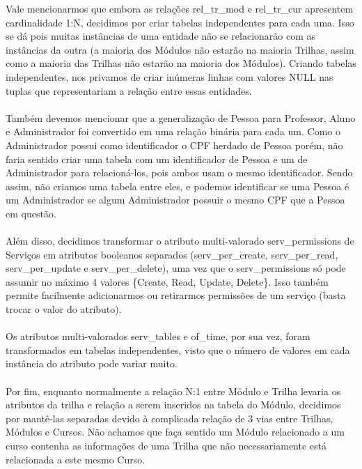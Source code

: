 \documentclass{article}
\begin{document}
    \quad Vale mencionarmos que embora as relações rel\_tr\_mod e rel\_tr\_cur apresentem cardinalidade 1:N, decidimos por criar tabelas independentes para cada uma. Isso se dá pois muitas instâncias de uma entidade não se relacionarão com as instâncias da outra (a maioria dos Módulos não estarão na maioria Trilhas, assim como a maioria das Trilhas não estarão na maioria dos Módulos). Criando tabelas independentes, nos privamos de criar inúmeras linhas com valores NULL nas tuplas que representariam a relação entre essas entidades. \\
    \\
    \null \quad Também devemos mencionar que a generalização de Pessoa para Professor, Aluno e Administrador foi convertido em uma relação binária para cada um. Como o Administrador possui como identificador o CPF herdado de Pessoa porém, não faria sentido criar uma tabela com um identificador de Pessoa e um de Administrador para relacioná-los, pois ambos usam o mesmo identificador. Sendo assim, não criamos uma tabela entre eles, e podemos identificar se uma Pessoa é um Administrador se algum Administrador possuir o mesmo CPF que a Pessoa em questão. \\
    \\
    \null \quad Além disso, decidimos transformar o atributo multi-valorado serv\_permissions de Serviços em atributos booleanos separados (serv\_per\_create, serv\_per\_read, serv\_per\_update e serv\_per\_delete), uma vez que o serv\_permissions só pode assumir no máximo 4 valores \{Create, Read, Update, Delete\}. Isso também permite facilmente adicionarmos ou retirarmos permissões de um serviço (basta trocar o valor do atributo). \\
    \\
    \null \quad Os atributos multi-valorados serv\_tables e of\_time, por sua vez, foram transformados em tabelas independentes, visto que o número de valores em cada instância do atributo pode variar muito. \\
    \\
    \null \quad Por fim, enquanto normalmente a relação N:1 entre Módulo e Trilha levaria os atributos da trilha e relação a serem inseridos na tabela do Módulo, decidimos por mantê-las separadas devido à complicada relação de 3 vias entre Trilhas, Módulos e Cursos. Não achamos que faça sentido um Módulo relacionado a um curso contenha as informações de uma Trilha que não necessariamente está relacionada a este mesmo Curso.
\end{document}
